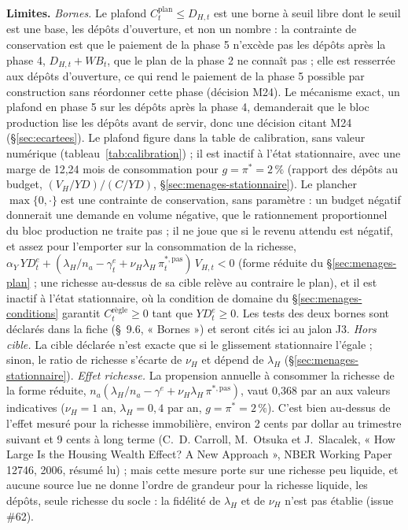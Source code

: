 \documentclass[11pt,a4paper]{article}
\newcommand{\limites}{\par\noindent\textbf{Limites.} }
\begin{document}
\begin{proposee}
\limites \emph{Bornes.} Le plafond $C^{\mathrm{plan}}_t \le D_{H,t}$ est une borne à seuil libre dont le seuil est une base, les dépôts d'ouverture, et non un nombre : la contrainte de conservation est que le paiement de la phase 5 n'excède pas les dépôts après la phase 4, $D_{H,t} + \mathit{WB}_t$, que le plan de la phase 2 ne connaît pas ; elle est resserrée aux dépôts d'ouverture, ce qui rend le paiement de la phase 5 possible par construction sans réordonner cette phase (décision M24). Le mécanisme exact, un plafond en phase 5 sur les dépôts après la phase 4, demanderait que le bloc production lise les dépôts avant de servir, donc une décision citant M24 (\S\ref{sec:ecartees}). Le plafond figure dans la table de calibration, sans valeur numérique (tableau~\ref{tab:calibration}) ; il est inactif à l'état stationnaire, avec une marge de 12,24 mois de consommation pour $g = \pi^\ast = 2\,\%$ (rapport des dépôts au budget, $(V_H/\mathit{YD})/(C/\mathit{YD})$, \S\ref{sec:menages-stationnaire}). Le plancher $\max\{0, \cdot\}$ est une contrainte de conservation, sans paramètre : un budget négatif donnerait une demande en volume négative, que le rationnement proportionnel du bloc production ne traite pas ; il ne joue que si le revenu attendu est négatif, et assez pour l'emporter sur la consommation de la richesse, $\alpha_Y\,\mathit{YD}^e_t + (\lambda_H/n_a - \gamma^e_t + \nu_H\lambda_H\,\pi^{\ast,\mathrm{pas}}_t)\,V_{H,t} < 0$ (forme réduite du \S\ref{sec:menages-plan} ; une richesse au-dessus de sa cible relève au contraire le plan), et il est inactif à l'état stationnaire, où la condition de domaine du \S\ref{sec:menages-conditions} garantit $C^{\text{règle}}_t \ge 0$ tant que $\mathit{YD}^e_t \ge 0$. Les tests des deux bornes sont déclarés dans la fiche (\S~9.6, « Bornes ») et seront cités ici au jalon J3. \emph{Hors cible.} La cible déclarée n'est exacte que si le glissement stationnaire l'égale ; sinon, le ratio de richesse s'écarte de $\nu_H$ et dépend de $\lambda_H$ (\S\ref{sec:menages-stationnaire}). \emph{Effet richesse.} La propension annuelle à consommer la richesse de la forme réduite, $n_a(\lambda_H/n_a - \gamma^e + \nu_H\lambda_H\,\pi^{\ast,\mathrm{pas}})$, vaut 0,368 par an aux valeurs indicatives ($\nu_H = 1$ an, $\lambda_H = 0{,}4$ par an, $g = \pi^\ast = 2\,\%$). C'est bien au-dessus de l'effet mesuré pour la richesse immobilière, environ 2 cents par dollar au trimestre suivant et 9 cents à long terme (C.~D. Carroll, M.~Otsuka et J.~Slacalek, « How Large Is the Housing Wealth Effect? A New Approach », NBER Working Paper 12746, 2006, résumé lu) ; mais cette mesure porte sur une richesse peu liquide, et aucune source lue ne donne l'ordre de grandeur pour la richesse liquide, les dépôts, seule richesse du socle : la fidélité de $\lambda_H$ et de $\nu_H$ n'est pas établie (issue \#62).


\end{proposee}
\end{document}
